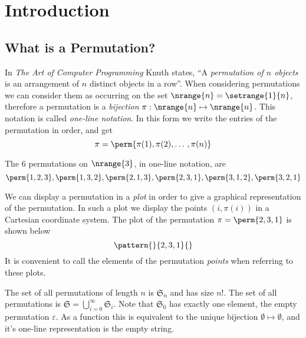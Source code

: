 \chapter{Introduction\label{cha:introduction}}
\section{What is a Permutation?}
In \emph{The Art of Computer Programming} \cite[p.~45]{Knuth:1997:ACP:260999} Knuth states,
\enquote{A \emph{permutation of \(n\) objects} is an arrangement of \(n\) distinct
objects in a row}.
When considering permutations we can consider them as
occurring on the set \(\nrange{n} = \setrange{1}{n}\), therefore a permutation
is a \emph{bijection} \(\pi:\nrange{n} \mapsto \nrange{n}\). %
This
notation
is called
\emph{one-line notation}.
In this form we write the entries of the permutation in order, and get
\begin{equation*}
\pi = \perm{\pi(1),\pi(2),\dotso,\pi(n)}
\end{equation*}

\begin{example}
The 6 permutations on \(\nrange{3}\), in one-line notation, are
\begin{equation*}
\perm{1,2,3},\perm{1,3,2},\perm{2,1,3},\perm{2,3,1}, \perm{3,1,2}, \perm{3,2,1}
\end{equation*}
\end{example}

We can display a permutation in a \emph{plot} in order to give a graphical
representation of the permutation. In such a plot we display the points
\((i,\pi(i))\) in a Cartesian coordinate system. The plot of the permutation
\(\pi = \perm{2,3,1}\) is shown below
\begin{equation*}
    \pattern{}{2,3,1}{}
\end{equation*}
It is convenient to call the elements of the permutation \emph{points} when
referring to these plots.

The set of all permutations of length \(n\) is \(\mathfrak{S}_n\) and
has size \(n!\). The set of all permutations is
\(\mathfrak{S}=\bigcup_{i=0}^{\infty}\mathfrak{S}_i\). Note that \(\mathfrak{S}_0\)
has exactly one element, the empty permutation \(\varepsilon\). As a function
this is equivalent to the unique bijection \(\emptyset \mapsto \emptyset\), and
it's one-line representation is the empty string.

